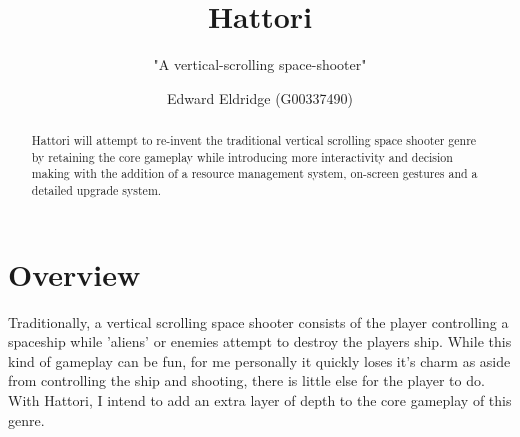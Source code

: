 \documentclass[a4paper]{scrreprt}
\title{Hattori}
\subtitle{"A vertical-scrolling space-shooter"}
\author{Edward Eldridge (G00337490)}
\begin{document}
\maketitle

\begin{abstract}

 Hattori will attempt to re-invent the traditional vertical scrolling space shooter genre by retaining the core gameplay while introducing more interactivity and decision making with the addition of a resource management system, on-screen gestures and a detailed upgrade system. 

\end{abstract}

{
  \hypersetup{linkcolor=black}
  \tableofcontents
}

\chapter{Overview}

Traditionally, a vertical scrolling space shooter consists of the player controlling a spaceship while 'aliens' or enemies attempt to destroy the players ship.
While this kind of gameplay can be fun, for me personally it quickly loses it's charm as aside from controlling the ship and shooting, there is little else for the player to do. With Hattori, I intend to add an extra layer of depth to the core gameplay of this genre.
\end{document}
